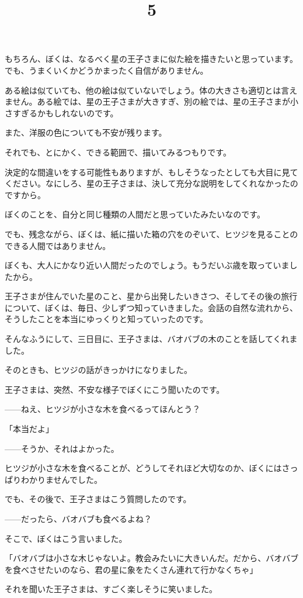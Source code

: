 もちろん、ぼくは、なるべく星の王子さまに似た絵を描きたいと思っています。でも、うまくいくかどうかまったく自信がありません。

ある絵は似ていても、他の絵は似ていないでしょう。体の大きさも適切とは言えません。ある絵では、星の王子さまが大きすぎ、別の絵では、星の王子さまが小さすぎるかもしれないのです。

また、洋服の色についても不安が残ります。

それでも、とにかく、できる範囲で、描いてみるつもりです。

決定的な間違いをする可能性もありますが、もしそうなったとしても大目に見てください。なにしろ、星の王子さまは、決して充分な説明をしてくれなかったのですから。

ぼくのことを、自分と同じ種類の人間だと思っていたみたいなのです。

でも、残念ながら、ぼくは、紙に描いた箱の穴をのぞいて、ヒツジを見ることのできる人間ではありません。

ぼくも、大人にかなり近い人間だったのでしょう。もうだいぶ歳を取っていましたから。

\title{5}

王子さまが住んでいた星のこと、星から出発したいきさつ、そしてその後の旅行について、ぼくは、毎日、少しずつ知っていきました。会話の自然な流れから、そうしたことを本当にゆっくりと知っていったのです。

そんなふうにして、三日目に、王子さまは、バオバブの木のことを話してくれました。

そのときも、ヒツジの話がきっかけになりました。

王子さまは、突然、不安な様子でぼくにこう聞いたのです。

——ねえ、ヒツジが小さな木を食べるってほんとう？

「本当だよ」

——そうか、それはよかった。


ヒツジが小さな木を食べることが、どうしてそれほど大切なのか、ぼくにはさっぱりわかりませんでした。

でも、その後で、王子さまはこう質問したのです。

——だったら、バオバブも食べるよね？

そこで、ぼくはこう言いました。

「バオバブは小さな木じゃないよ。教会みたいに大きいんだ。だから、バオバブを食べさせたいのなら、君の星に象をたくさん連れて行かなくちゃ」

それを聞いた王子さまは、すごく楽しそうに笑いました。

